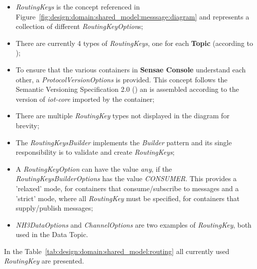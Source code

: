 \begin{itemize}
   \item \textit{RoutingKeys} is the concept referenced in Figure~\ref{fig:design:domain:shared_model:messsage:diagram} and represents a collection of different \textit{RoutingKeyOption}s;
   \item There are currently 4 types of \textit{RoutingKeys}, one for each \textbf{Topic} (according to );
   \item To ensure that the various containers in \textbf{Sensae Console} understand each other, a \textit{ProtocolVersionOptions} is provided. This concept follows the Semantic Versioning Specification 2.0 (\cite{semver}) an is assembled according to the version of \textit{iot-core} imported by the container;
   \item There are multiple \textit{RoutingKey} types not displayed in the diagram for brevity;
   \item The \textit{RoutingKeysBuilder} implements the \textit{Builder} pattern and its single responsibility is to validate and create \textit{RoutingKeys};
   \item A \textit{RoutingKeyOption} can have the value \textit{any}, if the \textit{RoutingKeysBuilderOptions} has the value \textit{CONSUMER}. This provides a 'relaxed' mode, for containers that consume/subscribe to messages and a 'strict' mode, where all \textit{RoutingKey} must be specified, for containers that supply/publish messages;
   \item \textit{NH3DataOptions} and \textit{ChannelOptions} are two examples of \textit{RoutingKey}, both used in the Data Topic.
\end{itemize}

In the Table~\ref{tab:design:domain:shared_model:routing} all currently used \textit{RoutingKey} are presented.

